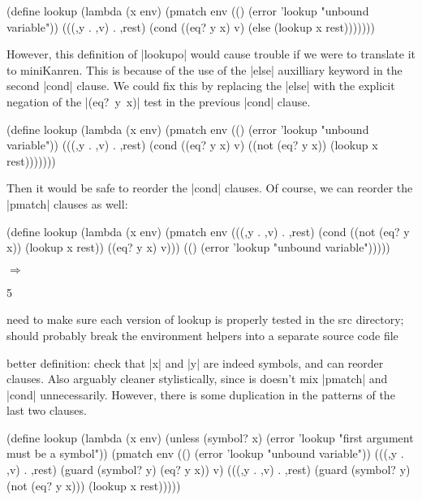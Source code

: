 \begin{schemedisplay}
(define lookup
  (lambda (x env)
    (pmatch env
      (() (error 'lookup "unbound variable"))
      (((,y . ,v) . ,rest)
       (cond
         ((eq? y x) v)
         (else (lookup x rest)))))))
\end{schemedisplay}

However, this definition of \scheme|lookupo| would cause trouble if we
were to translate it to miniKanren.  This is because of the use of the
\scheme|else| auxilliary keyword in the second \scheme|cond| clause.
We could fix this by replacing the \scheme|else| with the explicit
negation of the \mbox{\scheme|(eq? y x)|} test in the previous
\scheme|cond| clause.

\begin{schemedisplay}
(define lookup
  (lambda (x env)
    (pmatch env
      (() (error 'lookup "unbound variable"))
      (((,y . ,v) . ,rest)
       (cond
         ((eq? y x) v)
         ((not (eq? y x)) (lookup x rest)))))))
\end{schemedisplay}

Then it would be safe to reorder the \scheme|cond| clauses.  Of
course, we can reorder the \scheme|pmatch| clauses as well:

\begin{schemedisplay}
(define lookup
  (lambda (x env)
    (pmatch env
      (((,y . ,v) . ,rest)
       (cond
         ((not (eq? y x)) (lookup x rest))
         ((eq? y x) v)))
      (() (error 'lookup "unbound variable")))))
\end{schemedisplay}

\noindent{} $\Rightarrow$
\begin{schemeresponsebox}5\end{schemeresponsebox}

need to make sure each version of lookup is properly tested in the src directory;
should probably break the environment helpers into a separate source code file


better definition: check that \scheme|x| and \scheme|y| are indeed
symbols, and can reorder clauses.  Also arguably cleaner
stylistically, since is doesn't mix \scheme|pmatch| and \scheme|cond|
unnecessarily.  However, there is some duplication in the patterns of
the last two clauses.

\begin{schemedisplay}
(define lookup
  (lambda (x env)
    (unless (symbol? x)
      (error 'lookup "first argument must be a symbol"))
    (pmatch env
      (() (error 'lookup "unbound variable"))
      (((,y . ,v) . ,rest) (guard (symbol? y) (eq? y x))
       v)
      (((,y . ,v) . ,rest) (guard (symbol? y) (not (eq? y x)))
       (lookup x rest)))))
\end{schemedisplay}

